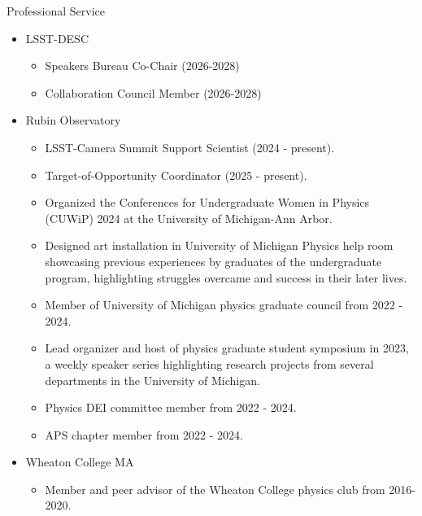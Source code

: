 \documentclass{resume} %
\begin{document}
\begin{rSection}{Professional Service}
    \begin{itemize}
        \item LSST-DESC
        \begin{itemize}
            \item Speakers Bureau Co-Chair (2026-2028)
            \item Collaboration Council Member (2026-2028)
        \end{itemize}
        \item Rubin Observatory
        \begin{itemize}
            \item LSST-Camera Summit Support Scientist (2024 - present).
            \item Target-of-Opportunity Coordinator (2025 - present).
        \end{itemize}
        \begin{itemize}
            \item Organized the Conferences for Undergraduate Women in Physics (CUWiP) 2024 at the University of Michigan-Ann Arbor.
            \item Designed art installation in University of Michigan Physics help room showcasing previous experiences by graduates of the undergraduate program, highlighting struggles overcame and success in their later lives.
            \item Member of University of Michigan physics graduate council from 2022 - 2024. 
            \item Lead organizer and host of physics graduate student symposium in 2023, a weekly speaker series highlighting research projects from several departments in the University of Michigan.
        	\item Physics DEI committee member from 2022 - 2024.
	        \item APS chapter member from 2022 - 2024.
        \end{itemize}
        \item Wheaton College MA
        \begin{itemize}
    
            \item Member and peer advisor of the Wheaton College physics club from 2016-2020.
        \end{itemize}
    \end{itemize}
\end{rSection}
\newpage
\end{document}
